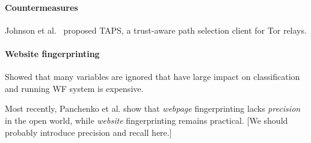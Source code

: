 \paragraph{Countermeasures}
\cite{Edman2009a}
\cite{Nithyanand2016a}
\cite{Akhoondi2012a}


\cite{Mathewson2004a}
\cite{Mittal2011a}
\cite{Wacek2013a}
\cite{Johnson2013a}
\cite{Juen2015a}
\cite{Danezis2004a}
\cite{Levine2004a}
\cite{Bauer2007a}
\cite{Dingledine2009a}


Johnson et al.~\cite{Johnson2015a} proposed TAPS, a trust-aware path selection
client for Tor relays.

\cite{torstinks}

\paragraph{Website fingerprinting}
\cite{Juarez2014a}
Showed that many variables are ignored that have large impact on classification
and running WF system is expensive.

Most recently, Panchenko et al. show that \emph{webpage} fingerprinting lacks
 \emph{precision} in the open world, while \emph{website} fingerprinting remains practical.
\cite{Panchenko2016a} [We should probably introduce precision and recall here.]
